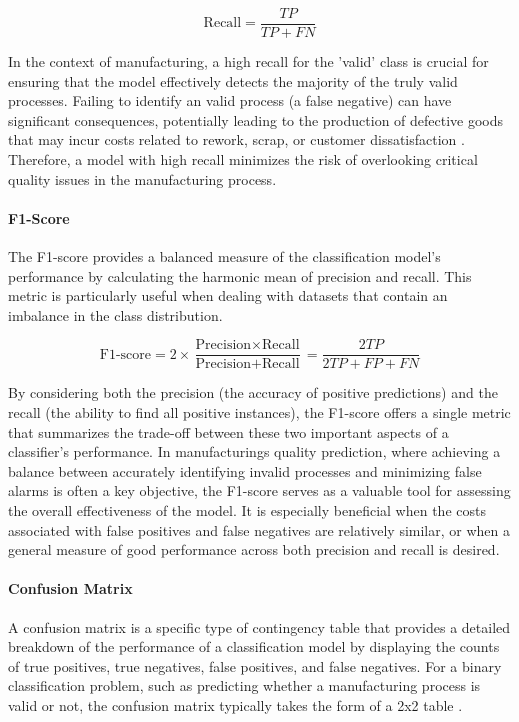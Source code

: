 \begin{equation}
  \text{Recall} = \frac{TP}{TP + FN}
\end{equation}

In the context of manufacturing, a high recall for the 'valid' class is crucial for ensuring that the model effectively detects the majority of the truly valid processes. Failing to identify an valid process (a false negative) can have significant consequences, potentially leading to the production of defective goods that may incur costs related to rework, scrap, or customer dissatisfaction \autocite{kharitonov2022comparative}. Therefore, a model with high recall minimizes the risk of overlooking critical quality issues in the manufacturing process.

\paragraph{\textbf{F1-Score}}
The F1-score provides a balanced measure of the classification model's performance by calculating the harmonic mean of precision and recall. This metric is particularly useful when dealing with datasets that contain an imbalance in the class distribution.

\begin{equation}
  \text{F1-score} = 2 \times \frac{\text{Precision} \times \text{Recall}}{\text{Precision} + \text{Recall}} = \frac{2TP}{2TP + FP + FN}
\end{equation}

By considering both the precision (the accuracy of positive predictions) and the recall (the ability to find all positive instances), the F1-score offers a single metric that summarizes the trade-off between these two important aspects of a classifier's performance. In manufacturings quality prediction, where achieving a balance between accurately identifying invalid processes and minimizing false alarms is often a key objective, the F1-score serves as a valuable tool for assessing the overall effectiveness of the model. It is especially beneficial when the costs associated with false positives and false negatives are relatively similar, or when a general measure of good performance across both precision and recall is desired.

\paragraph{\textbf{Confusion Matrix}}
A confusion matrix is a specific type of contingency table that provides a detailed breakdown of the performance of a classification model by displaying the counts of true positives, true negatives, false positives, and false negatives. For a binary classification problem, such as predicting whether a manufacturing process is valid or not, the confusion matrix typically takes the form of a 2x2 table \autocite{fahrmeir2016statistik}.

